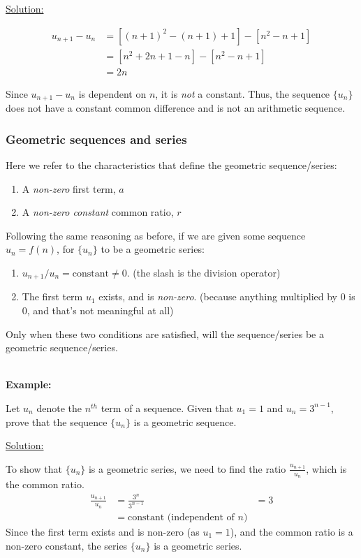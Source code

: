 \documentclass[12pt, a4paper, titlepage]{article}
\begin{document}
\underline{Solution:}

\begin{align*}
    u_{n + 1} - u_n &= [(n + 1)^2 - (n + 1) + 1] - [n^2 - n + 1] \\
    &= [n^2 + 2n + 1 - n] - [n^2 - n + 1] \\
    &= 2n
\end{align*}

Since $u_{n + 1} - u_n$ is dependent on $n$, it is \emph{not} a constant. Thus, the sequence $\{u_n\}$ does not have a constant common difference        and is not an arithmetic sequence.

\subsubsection{Geometric sequences and series}

Here we refer to the characteristics that define the geometric sequence/series:

\begin{enumerate}
    \item A \emph{non-zero} first term, $a$
    \item A \emph{non-zero constant} common ratio, $r$
\end{enumerate}

Following the same reasoning as before, if we are given some sequence $u_n = f(n)$, for $\{u_n\}$ to be a geometric series:

\begin{enumerate}
    \item $u_{n + 1} / u_n = \text{constant} \neq 0$. (the slash is the division operator)
    \item The first term $u_1$ exists, and is \emph{non-zero}. (because anything multiplied by 0 is 0, and that's not meaningful at all)
\end{enumerate}

Only when these two conditions are satisfied, will the sequence/series be a geometric sequence/series.

\textbf{\\ Example:}

Let $u_n$ denote the $n^{th}$ term of a sequence. Given that $u_1 = 1$ and $u_n = 3^{n - 1}$, prove that the sequence $\{u_n\}$ is a geometric sequence.

\underline{Solution:}

To show that $\{u_n\}$ is a geometric series, we need to find the ratio $\frac{u_{n + 1}}{u_n}$, which is the common ratio.
\begin{align*}
    \frac{u_{n + 1}}{u_n} &= \frac{3^{n}}{3^{n - 1}}
    &= 3 \\
    &= \text{constant (independent of } n \text{)}
\end{align*}
Since the first term exists and is non-zero (as $u_1 = 1$), and the common ratio is a non-zero constant, the series $\{u_n\}$ is a geometric series.
\end{document}
